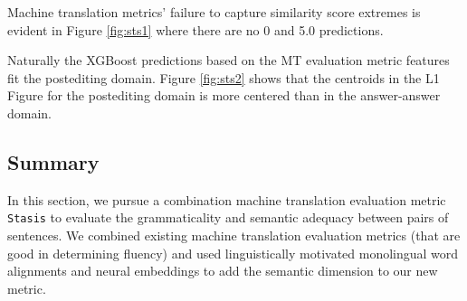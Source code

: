 Machine translation metrics' failure to capture similarity score extremes is evident in Figure \ref{fig:sts1} where there are no 0 and 5.0 predictions. 

Naturally the XGBoost predictions based on the MT evaluation metric features fit the postediting domain. Figure \ref{fig:sts2} shows that the centroids in the L1 Figure for the postediting domain is more centered than in the answer-answer domain.

\subsection{Summary}

In this section, we pursue a combination machine translation evaluation metric {\tt Stasis} to evaluate the grammaticality and semantic adequacy between pairs of sentences. We combined existing machine translation evaluation metrics (that are good in determining fluency) and used linguistically motivated monolingual word alignments and neural embeddings to add the semantic dimension to our new metric.